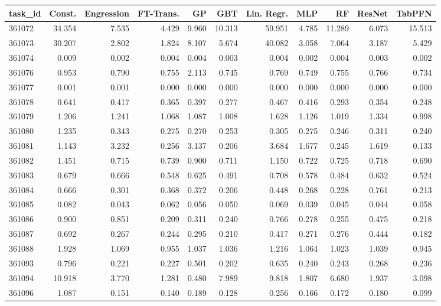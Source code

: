 \begin{tabular}{lrrrrrrrrrr}
\toprule
task\_id & Const. & Engression & FT-Trans. & GP & GBT & Lin. Regr. & MLP & RF & ResNet & TabPFN \\
\midrule
361072 & 34.354 & 7.535 & 4.429 & 9.960 & 10.313 & 59.951 & 4.785 & 11.289 & 6.073 & 15.513 \\
361073 & 30.207 & 2.802 & 1.824 & 8.107 & 5.674 & 40.082 & 3.058 & 7.064 & 3.187 & 5.429 \\
361074 & 0.009 & 0.002 & 0.004 & 0.004 & 0.003 & 0.004 & 0.002 & 0.004 & 0.003 & 0.002 \\
361076 & 0.953 & 0.790 & 0.755 & 2.113 & 0.745 & 0.769 & 0.749 & 0.755 & 0.766 & 0.734 \\
361077 & 0.001 & 0.001 & 0.000 & 0.000 & 0.000 & 0.000 & 0.000 & 0.000 & 0.000 & 0.000 \\
361078 & 0.641 & 0.417 & 0.365 & 0.397 & 0.277 & 0.467 & 0.416 & 0.293 & 0.354 & 0.248 \\
361079 & 1.206 & 1.241 & 1.068 & 1.087 & 1.008 & 1.628 & 1.126 & 1.019 & 1.334 & 0.998 \\
361080 & 1.235 & 0.343 & 0.275 & 0.270 & 0.253 & 0.305 & 0.275 & 0.246 & 0.311 & 0.240 \\
361081 & 1.143 & 3.232 & 0.256 & 3.137 & 0.206 & 3.684 & 1.677 & 0.245 & 1.619 & 0.133 \\
361082 & 1.451 & 0.715 & 0.739 & 0.900 & 0.711 & 1.150 & 0.722 & 0.725 & 0.718 & 0.690 \\
361083 & 0.679 & 0.666 & 0.548 & 0.625 & 0.491 & 0.708 & 0.578 & 0.484 & 0.632 & 0.524 \\
361084 & 0.666 & 0.301 & 0.368 & 0.372 & 0.206 & 0.448 & 0.268 & 0.228 & 0.761 & 0.213 \\
361085 & 0.082 & 0.043 & 0.062 & 0.056 & 0.050 & 0.069 & 0.039 & 0.045 & 0.044 & 0.058 \\
361086 & 0.900 & 0.851 & 0.209 & 0.311 & 0.240 & 0.766 & 0.278 & 0.255 & 0.475 & 0.218 \\
361087 & 0.692 & 0.267 & 0.244 & 0.295 & 0.210 & 0.417 & 0.271 & 0.276 & 0.444 & 0.182 \\
361088 & 1.928 & 1.069 & 0.955 & 1.037 & 1.036 & 1.216 & 1.064 & 1.023 & 1.039 & 0.945 \\
361093 & 0.796 & 0.221 & 0.227 & 0.501 & 0.202 & 0.635 & 0.240 & 0.243 & 0.268 & 0.236 \\
361094 & 10.918 & 3.770 & 1.281 & 0.480 & 7.989 & 9.818 & 1.807 & 6.680 & 1.937 & 3.098 \\
361096 & 1.087 & 0.151 & 0.140 & 0.189 & 0.128 & 0.256 & 0.166 & 0.172 & 0.180 & 0.099 \\

\end{tabular}
